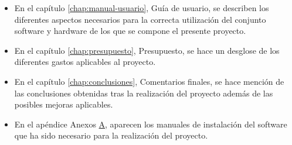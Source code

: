 \begin{itemize}
\item En el capítulo \ref{chap:manual-usuario}, Guía de usuario, se describen los diferentes aspectos necesarios para la correcta utilización del conjunto software y hardware de los que se compone el presente proyecto.

\item En el capítulo \ref{chap:presupuesto}, Presupuesto, se hace un desglose de los diferentes gastos aplicables al proyecto. 

\item En el capítulo \ref{chap:conclusiones}, Comentarios finales, se hace mención de las conclusiones obtenidas tras la realización del proyecto además de las posibles mejoras aplicables.

\item En el apéndice Anexos  \hyperref[appendix:anexos]{A}, aparecen los manuales de instalación del software que ha sido necesario para la realización del proyecto.

\end{itemize}
